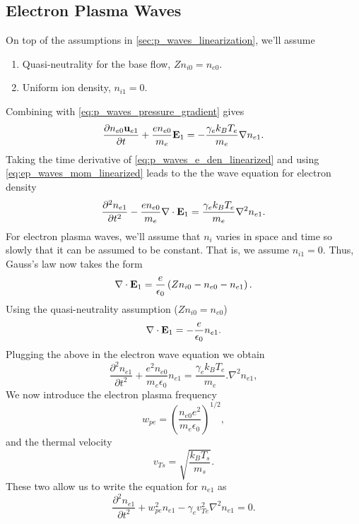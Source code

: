 \documentclass[a4paper,11pt]{report}
\begin{document}
\subsection{Electron Plasma Waves}
\label{sec:ep_waves}
On top of the assumptions in \cref{sec:p_waves_linearization}, we'll assume 
\begin{enumerate}
    \item Quasi-neutrality for the base flow, $Zn_{i0} = n_{e0}$.
    \item Uniform ion density, $n_{i1} = 0$.
\end{enumerate}

Combining  with \cref{eq:p_waves_pressure_gradient} gives
\begin{equation}
    \label{eq:ep_waves_mom_linearized}
    \frac{\partial n_{e0} \mathbf{u}_{e1}}{\partial t} + \frac{e n_{e0}}{m_e} \mathbf{E}_1 = - \frac{\gamma_e k_B T_e}{m_e} \nabla n_{e1}.
\end{equation}
Taking the time derivative of \cref{eq:p_waves_e_den_linearized} and using \cref{eq:ep_waves_mom_linearized} leads to the the wave equation for electron density
\begin{equation}
    \label{eq:ep_waves_den_combined}
    \frac{\partial^2 n_{e1}}{\partial t^2} - \frac{e n_{e0}}{m_e} \nabla \cdot \mathbf{E}_1 = \frac{\gamma_e k_B T_e}{m_e} \nabla^2 n_{e1}.
\end{equation}
For electron plasma waves, we'll assume that $n_{i}$ varies in space and time so slowly that it can be assumed to be constant. That is, we assume $n_{i1} = 0$. Thus, Gauss's law now takes the form
\begin{equation*}
    \nabla \cdot \mathbf{E}_1 = \frac{e}{\epsilon_0} \left ( Z n_{i0} - n_{e0} - n_{e1} \right ).
\end{equation*}
Using the quasi-neutrality assumption ($Zn_{i0} = n_{e0}$)
\begin{equation}
    \label{eq:ep_waves_efield_divergence}
    \nabla \cdot \mathbf{E}_1 = -\frac{e}{\epsilon_0} n_{e1}.
\end{equation}
Plugging the above in the electron wave equation we obtain
\begin{equation*}
    \frac{\partial^2 n_{e1}}{\partial t^2} + \frac{e^2 n_{e0}}{m_e \epsilon_0} n_{e1} = \frac{\gamma_e k_B T_e}{m_e}. \nabla^2 n_{e1},
\end{equation*}
We now introduce the electron plasma frequency
\begin{equation}
    \label{eq:ep_waves_frequency}
    w_{pe} = \left ( \frac{n_{e0} e^2}{m_e \epsilon_0} \right )^{1/2},
\end{equation}
and the thermal velocity
\begin{equation}
    \label{eq:ep_waves_thermal_vel}
    v_{Ts} = \sqrt{ \frac{k_B T_s}{m_s}}.
\end{equation}
These two allow us to write the equation for $n_{e1}$ as
\begin{equation}
    \label{eq:ep_waves_fluc_density}
    \frac{\partial^2 n_{e1}}{\partial t^2} + w^2_{pe} n_{e1} - \gamma_e v_{Te}^2 \nabla^2 n_{e1} = 0.
\end{equation}
\end{document}
